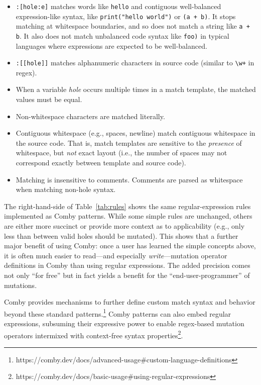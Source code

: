 \documentclass[acmsmall,screen,review,anonymous]{acmart}
\begin{document}
{\begin{itemize}
\item \texttt{\small:[hole:e]} matches words like \texttt{\small hello} and contiguous well-balanced expression-like syntax, like \texttt{\small print("hello world")} or \texttt{\small (a + b)}. It stops matching at whitespace boundaries, and so does not match a string like \texttt{\small a + b}. It also does not match unbalanced code syntax like \texttt{\small foo)} in typical languages where expressions are expected to be well-balanced.

\item \texttt{\small :[[hole]]} matches alphanumeric characters in source code (similar to \texttt{\small\textbackslash w+} in regex).

\item When a variable \emph{hole} occurs multiple times in a match
  template, the matched values must be equal.

\item Non-whitespace characters are matched literally.

\item Contiguous whitespace (e.g., spaces, newline) match contiguous whitespace in the source code. That is, match templates are sensitive to the \emph{presence} of whitespace, but \emph{not} exact layout (i.e., the number of spaces may not correspond exactly between template and source code).

\item Matching is insensitive to comments. Comments are parsed as whitespace when matching non-hole syntax.

\end{itemize}

The right-hand-side of Table~\ref{tab:rules} shows the same regular-expression rules 
implemented as Comby patterns.  While some simple rules are
unchanged, others are either more succinct or provide more context as
to applicability (e.g., only less than between valid holes should be
mutated).  This shows that a
further major benefit of using Comby: once a user has learned
the simple concepts above, it is often much easier to read---and
especially \emph{write}---mutation
operator definitions in Comby than using regular expressions.  The
added precision comes not only ``for free'' but in fact yields a
benefit for the ``end-user-programmer'' of mutations.

Comby provides mechanisms to further define custom match syntax and behavior
beyond these standard patterns.\footnote{https://comby.dev/docs/advanced-usage\#custom-language-definitions} Comby patterns can also embed regular expressions, subsuming their
expressive power to enable regex-based mutation operators intermixed with
context-free syntax
properties\footnote{https://comby.dev/docs/basic-usage\#using-regular-expressions}.



}
\end{document}
